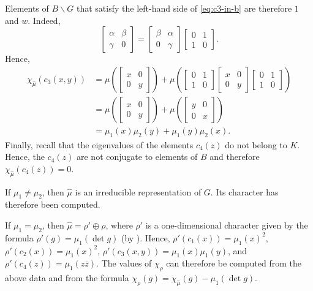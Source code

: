 \documentclass[../main.tex]{subfiles}
\begin{document}
Elements of $B\backslash G$ that satisfy the left-hand side of \eqref{eq:c3-in-b} are therefore $1$ and $w$. Indeed,
\[\begin{bmatrix}
	\alpha & \beta \\
	\gamma & 0
\end{bmatrix}=\begin{bmatrix}
	\beta & \alpha \\
	0 & \gamma
\end{bmatrix}\begin{bmatrix}
	0 & 1 \\
	1 & 0
\end{bmatrix}.\]
Hence,
\begin{align*}
	\chi_{\widehat\mu}(c_3(x,y)) &= \mu\left(\begin{bmatrix}
		x & 0 \\
		0 & y
	\end{bmatrix}\right)+\mu\left(\begin{bmatrix}
		0 & 1 \\
		1 & 0
	\end{bmatrix}\begin{bmatrix}
		x & 0 \\
		0 & y
	\end{bmatrix}\begin{bmatrix}
		0 & 1 \\
		1 & 0
	\end{bmatrix}\right) \\
	&= \mu\left(\begin{bmatrix}
		x & 0 \\
		0 & y
	\end{bmatrix}\right)+\mu\left(\begin{bmatrix}
		y & 0 \\
		0 & x
	\end{bmatrix}\right) \\
	&= \mu_1(x)\mu_2(y)+\mu_1(y)\mu_2(x).
\end{align*}
Finally, recall that the eigenvalues of the elements $c_4(z)$ do not belong to $K$. Hence, the $c_4(z)$ are not conjugate to elements of $B$ and therefore $\chi_{\widehat\mu}(c_4(z))=0$.

If $\mu_1\ne\mu_2$, then $\widehat\mu$ is an irreducible representation of $G$. Its character has therefore been computed.

If $\mu_1=\mu_2$, then $\widehat\mu=\rho'\oplus\rho$, where $\rho'$ is a one-dimensional character given by the formula $\rho'(g)=\mu_1(\det g)$ (by ). Hence, $\rho'(c_1(x))=\mu_1(x)^2$, $\rho'(c_2(x))=\mu_1(x)^2$, $\rho'(c_3(x,y))=\mu_1(x)\mu_1(y)$, and $\rho'(c_4(z))=\mu_1(z\overline z)$. The values of $\chi_\rho$ can therefore be computed from the above data and from the formula $\chi_\rho(g)=\chi_{\widehat\mu}(g)-\mu_1(\det g)$.
\end{document}
